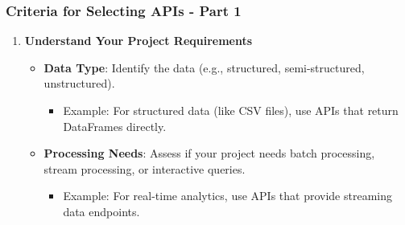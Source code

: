 \documentclass[aspectratio=169]{beamer}
\begin{document}
\begin{frame}[fragile]
    \frametitle{Criteria for Selecting APIs - Part 1}
    \begin{enumerate}
        \item \textbf{Understand Your Project Requirements}
        \begin{itemize}
            \item \textbf{Data Type}: Identify the data (e.g., structured, semi-structured, unstructured).
            \begin{itemize}
                \item Example: For structured data (like CSV files), use APIs that return DataFrames directly.
            \end{itemize}
            \item \textbf{Processing Needs}: Assess if your project needs batch processing, stream processing, or interactive queries.
            \begin{itemize}
                \item Example: For real-time analytics, use APIs that provide streaming data endpoints.
            \end{itemize}
        \end{itemize}
    \end{enumerate}
\end{frame}
\end{document}
